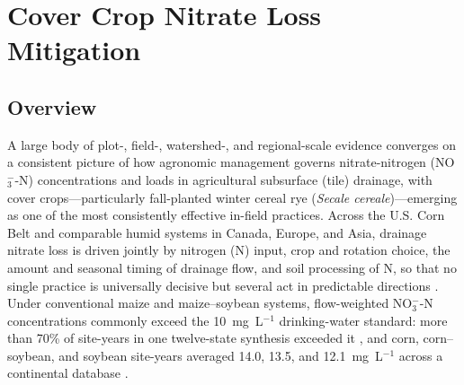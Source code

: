 \documentclass[11pt]{article}
\begin{document}
\section*{Cover Crop Nitrate Loss Mitigation}

\subsection{Overview}

A large body of plot-, field-, watershed-, and regional-scale evidence converges on a consistent picture of how agronomic management governs nitrate-nitrogen (NO$_3^-$-N) concentrations and loads in agricultural subsurface (tile) drainage, with cover crops---particularly fall-planted winter cereal rye (\emph{Secale cereale})---emerging as one of the most consistently effective in-field practices. Across the U.S. Corn Belt and comparable humid systems in Canada, Europe, and Asia, drainage nitrate loss is driven jointly by nitrogen (N) input, crop and rotation choice, the amount and seasonal timing of drainage flow, and soil processing of N, so that no single practice is universally decisive but several act in predictable directions \parencite{Dinnes2002}. Under conventional maize and maize--soybean systems, flow-weighted NO$_3^-$-N concentrations commonly exceed the 10~mg~L$^{-1}$ drinking-water standard: more than 70\% of site-years in one twelve-state synthesis exceeded it \parencite{Liu2021}, and corn, corn--soybean, and soybean site-years averaged 14.0, 13.5, and 12.1~mg~L$^{-1}$ across a continental database \parencite{Hertzberger2019}.
\end{document}

